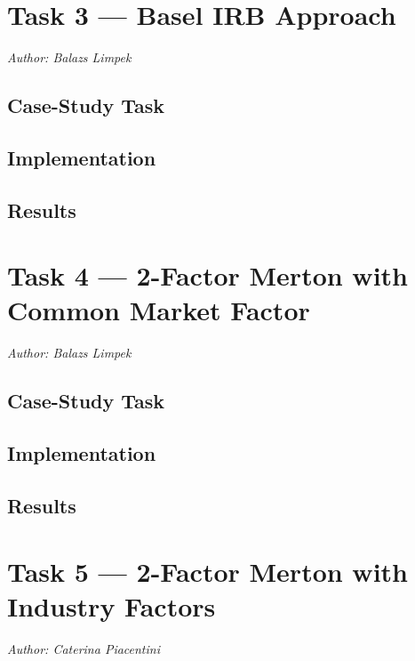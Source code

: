 \documentclass[
  11pt,
]{article}
\begin{document}
\section{Task 3 --- Basel IRB Approach}\label{task-3-basel-irb-approach}

\emph{Author: Balazs Limpek}

\subsection{Case-Study Task}\label{case-study-task-2}

\subsection{Implementation}\label{implementation}

\subsection{Results}\label{results}

\section{Task 4 --- 2-Factor Merton with Common Market
Factor}\label{task-4-2-factor-merton-with-common-market-factor}

\emph{Author: Balazs Limpek}

\subsection{Case-Study Task}\label{case-study-task-3}

\subsection{Implementation}\label{implementation-1}

\subsection{Results}\label{results-1}

\section{Task 5 --- 2-Factor Merton with Industry
Factors}\label{task-5-2-factor-merton-with-industry-factors}

\emph{Author: Caterina Piacentini}
\end{document}
